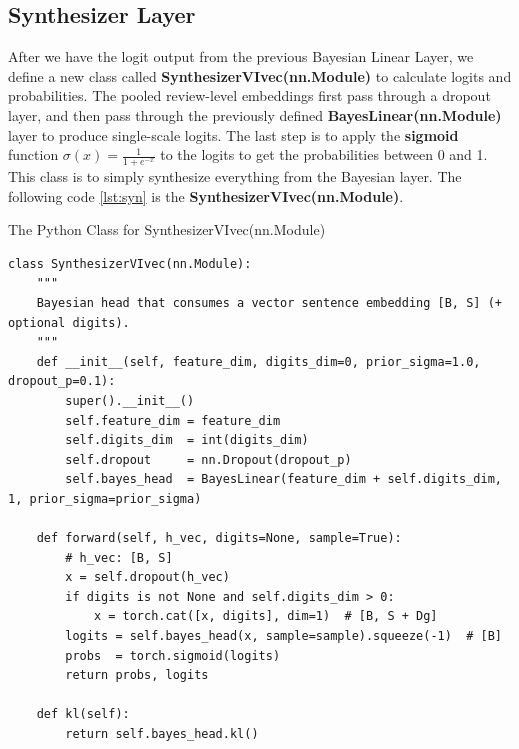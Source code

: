 \documentclass{article}
\begin{document}
\subsection{Synthesizer Layer}
After we have the logit output from the previous Bayesian Linear Layer, we define a new class called \textbf{SynthesizerVIvec(nn.Module)} to calculate logits and probabilities. The pooled review-level embeddings first pass through a dropout layer, and then pass through the previously defined \textbf{BayesLinear(nn.Module)} layer to produce single-scale logits. The last step is to apply the \textbf{sigmoid} function $\sigma(x)=\frac{1}{1+e^{-x}}$ to the logits to get the probabilities between 0 and 1. This class is to simply synthesize everything from the Bayesian layer. The following code \ref{lst:syn} is the \textbf{SynthesizerVIvec(nn.Module)}.
\begin{listing}[!ht]
\caption{The Python Class for SynthesizerVIvec(nn.Module)}
\label{lst:syn}
\begin{verbatim}
class SynthesizerVIvec(nn.Module):
    """
    Bayesian head that consumes a vector sentence embedding [B, S] (+ optional digits).
    """
    def __init__(self, feature_dim, digits_dim=0, prior_sigma=1.0, dropout_p=0.1):
        super().__init__()
        self.feature_dim = feature_dim
        self.digits_dim  = int(digits_dim)
        self.dropout     = nn.Dropout(dropout_p)
        self.bayes_head  = BayesLinear(feature_dim + self.digits_dim, 1, prior_sigma=prior_sigma)

    def forward(self, h_vec, digits=None, sample=True):
        # h_vec: [B, S]
        x = self.dropout(h_vec)
        if digits is not None and self.digits_dim > 0:
            x = torch.cat([x, digits], dim=1)  # [B, S + Dg]
        logits = self.bayes_head(x, sample=sample).squeeze(-1)  # [B]
        probs  = torch.sigmoid(logits)
        return probs, logits

    def kl(self):
        return self.bayes_head.kl()
\end{verbatim}
\end{listing}
\end{document}
